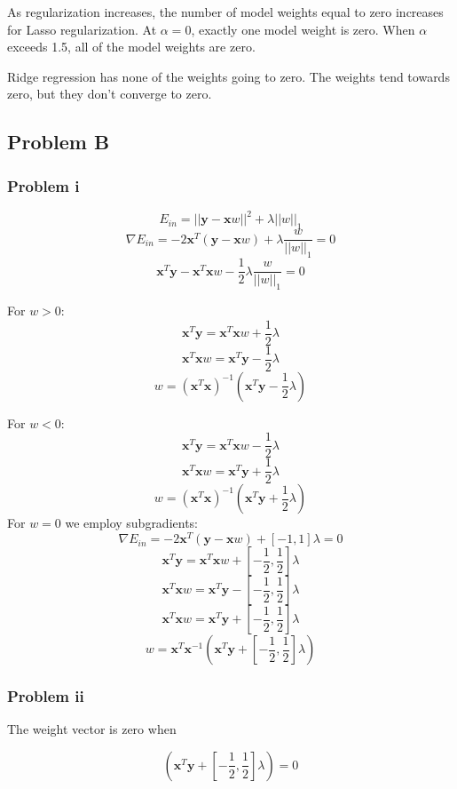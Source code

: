\documentclass[12pt]{article} %
\begin{document}
As regularization increases, the number of model weights equal to zero increases for Lasso regularization. At $\alpha = 0$, exactly one model weight is zero. When $\alpha$ exceeds 1.5, all of the model weights are zero.

Ridge regression has none of the weights going to zero. The weights tend towards zero, but they don't converge to zero.

\subsection{Problem B}
\subsubsection{Problem i}

$$E_{in} = ||\textbf{y} - \textbf{x}w||^2 + \lambda||w||_1$$
$$\nabla E_{in} = -2\textbf{x}^T (\textbf{y} - \textbf{x}w) + \lambda  \frac{w}{||w||_1}= 0$$
$$\textbf{x}^T \textbf{y} - \textbf{x}^T\textbf{x}w - \frac{1}{2} \lambda  \frac{w}{||w||_1}= 0$$

For $w > 0$:
$$\textbf{x}^T \textbf{y} = \textbf{x}^T\textbf{x}w + \frac{1}{2} \lambda $$
$$\textbf{x}^T\textbf{x}w =  \textbf{x}^T \textbf{y} - \frac{1}{2} \lambda$$
$$w = (\textbf{x}^T\textbf{x})^{-1}(\textbf{x}^T \textbf{y} - \frac{1}{2} \lambda)$$

For $w<0$:
$$\textbf{x}^T \textbf{y} = \textbf{x}^T\textbf{x}w - \frac{1}{2} \lambda $$
$$\textbf{x}^T\textbf{x}w =  \textbf{x}^T \textbf{y} + \frac{1}{2} \lambda$$
$$w = (\textbf{x}^T\textbf{x})^{-1}(\textbf{x}^T \textbf{y} + \frac{1}{2} \lambda)$$
For $w=0$ we employ subgradients:
$$\nabla E_{in} = -2\textbf{x}^T (\textbf{y} - \textbf{x}w) +  [-1, 1] \lambda= 0$$
$$\textbf{x}^T \textbf{y} = \textbf{x}^T\textbf{x}w +  [-\frac{1}{2}, \frac{1}{2}] \lambda$$
$$\textbf{x}^T\textbf{x}w =  \textbf{x}^T \textbf{y} - [-\frac{1}{2}, \frac{1}{2}]  \lambda$$
$$\textbf{x}^T\textbf{x}w =  \textbf{x}^T \textbf{y} + [-\frac{1}{2}, \frac{1}{2}]  \lambda$$
$$w =  \textbf{x}^T\textbf{x}^{-1}(\textbf{x}^T \textbf{y} + [-\frac{1}{2}, \frac{1}{2}]  \lambda)$$




\subsubsection{Problem ii}

The weight vector is zero when 

$$(\textbf{x}^T \textbf{y} + [-\frac{1}{2}, \frac{1}{2}] \lambda) = 0$$
\end{document}
